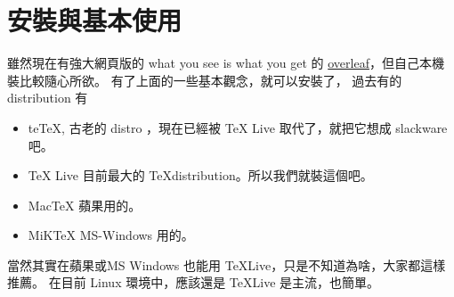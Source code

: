 \chapter{安裝與基本使用}
雖然現在有強大網頁版的 what you see is what you get 的 
\href{https://www.overleaf.com/}{overleaf}，但自己本機裝比較隨心所欲。
有了上面的一些基本觀念，就可以安裝了， 過去有的 distribution 有
\begin{itemize}
 \item teTeX, 古老的 distro ，現在已經被 TeX Live 取代了，就把它想成 slackware 吧。
 \item TeX Live 目前最大的 \TeX distribution。所以我們就裝這個吧。
 \item MacTeX 蘋果用的。
 \item MiKTeX MS-Windows 用的。
\end{itemize}
當然其實在蘋果或MS Windows 也能用 \TeX Live，只是不知道為啥，大家都這樣推薦。
在目前 Linux 環境中，應該還是 \TeX Live 是主流，也簡單。


